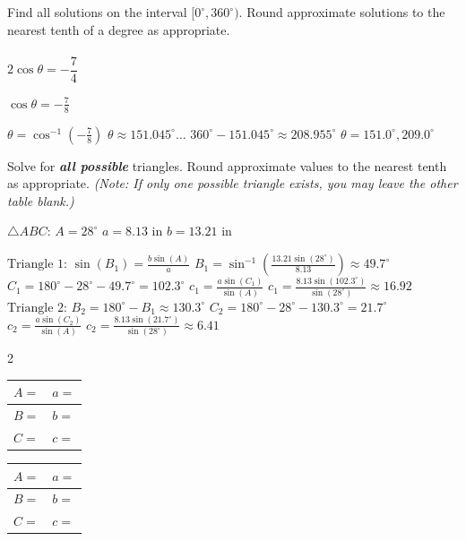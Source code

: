 \documentclass[11pt]{exam}
\begin{document}
\begin{questions}
\question[5]
Find all solutions on the interval $[0^\circ,360^\circ)$. Round approximate solutions to the nearest tenth of a degree as appropriate.\\ \\
\(2 \cos \theta = -\dfrac{7}{4}\)
    \begin{solution}
        \(\cos \theta = -\frac{7}{8}\)
    
        \(\theta = \cos^{-1}\left(-\frac{7}{8}\right)\)
        \(\theta \approx 151.045^\circ \dots\)
        \(360^\circ - 151.045^\circ \approx 208.955^\circ\)
        \(\boxed{\theta = 151.0^\circ, 209.0^\circ}\)
    \end{solution}
\answerline

\question[5] Solve for \textit{\textbf{all possible}} triangles. Round approximate values to the nearest tenth as appropriate. \emph{(Note: If only one possible triangle exists, you may leave the other table blank.)}

$\triangle{ABC}$: \quad $A=28^\circ$ \qquad $a=8.13$ in \qquad $b=13.21$ in
\begin{solution}
    \(\text{Triangle 1:}\)
    \(\sin(B_1) = \frac{b\sin(A)}{a}\)
    \(B_1 = \sin^{-1}\left(\frac{13.21\sin(28^\circ)}{8.13}\right) \approx 49.7^\circ\)
    \(C_1 = 180^\circ - 28^\circ - 49.7^\circ = 102.3^\circ\)
    \(c_1 = \frac{a\sin(C_1)}{\sin(A)}\)
    \(c_1 = \frac{8.13\sin(102.3^\circ)}{\sin(28^\circ)} \approx 16.92\)
    \(\text{Triangle 2:}\)
    \(B_2 = 180^\circ - B_1 \approx 130.3^\circ\)
    \(C_2 = 180^\circ - 28^\circ - 130.3^\circ = 21.7^\circ\)
    \(c_2 = \frac{a\sin(C_2)}{\sin(A)}\)
    \(c_2 = \frac{8.13\sin(21.7^\circ)}{\sin(28^\circ)} \approx 6.41\)
\end{solution}

\begin{multicols}{2}

    \renewcommand{\arraystretch}{2.5}
\begin{tabular}{|p{3cm}|p{3cm}|}\hline
   $A=$  & $a=$ \\\hline
   $B=$  & $b=$ \\\hline
   $C=$  & $c=$ \\\hline
\end{tabular}

\columnbreak

\renewcommand{\arraystretch}{2.5}
\begin{tabular}{|p{3cm}|p{3cm}|}\hline
   $A=$  & $a=$ \\\hline
   $B=$  & $b=$ \\\hline
   $C=$  & $c=$ \\\hline
\end{tabular}


\end{multicols}
\end{questions}
\end{document}
